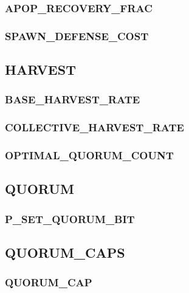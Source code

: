 \subsubsection{APOP\_RECOVERY\_FRAC}

\subsubsection{SPAWN\_DEFENSE\_COST}


\subsection{HARVEST}


\subsubsection{BASE\_HARVEST\_RATE}

\subsubsection{COLLECTIVE\_HARVEST\_RATE}

\subsubsection{OPTIMAL\_QUORUM\_COUNT}


\subsection{QUORUM}


\subsubsection{P\_SET\_QUORUM\_BIT}



\subsection{QUORUM\_CAPS}

\subsubsection{QUORUM\_CAP}

